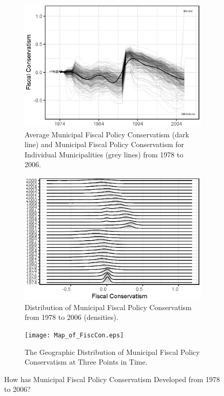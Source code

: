 \documentclass[a4paper,12pt]{article}
\begin{document}
	
\begin{figure}
\centering 
	\begin{subfigure}[h]{0.38\textwidth} 
	\includegraphics[width=1\textwidth]{times_lines_inflation_adjusted.eps}
	\caption{Average Municipal Fiscal Policy Conservatism (dark line) and Municipal Fiscal Policy Conservatism for Individual Municipalities (grey lines) from 1978 to 2006.}
	\label{fig:timeline}
			\end{subfigure} \hspace{1cm}
		\begin{subfigure}{0.38\textwidth} 
	\includegraphics[width=1\textwidth]{JoyPlotFiscal_inflation_adjusted.eps}
	\caption{Distribution of Municipal Fiscal Policy Conservatism from 1978 to 2006 (densities).}
	\label{fig:lines}
	\end{subfigure}
		\begin{subfigure}{0.9\textwidth} 
	\texttt{[image: Map\_of\_FiscCon.eps]}
	\caption{The Geographic Distribution of Municipal Fiscal Policy Conservatism at Three Points in Time.}
	\label{fig:map}
		\end{subfigure} 
	
	\caption{How has Municipal Fiscal Policy Conservatism Developed from 1978 to 2006?}
	\label{fig:descriptive}
	
\end{figure}
\end{document}
